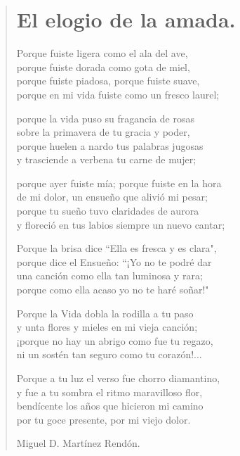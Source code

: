 \documentclass[12pt, twoside]{book}
\begin{document}
\begin{verse}
\begin{center}
\section{El elogio de la amada.}
\end{center}

Porque fuiste ligera como el ala del ave,\\
porque fuiste dorada como gota de miel,\\
porque fuiste piadosa, porque fuiste suave,\\
porque en mi vida fuiste como un fresco laurel;\newline

porque la vida puso su fragancia de rosas\\
sobre la primavera de tu gracia y poder,\\
porque huelen a nardo tus palabras jugosas\\
y trasciende a verbena tu carne de mujer;\newline

porque ayer fuiste mía; porque fuiste en la hora\\
de mi dolor, un ensueño que alivió mi pesar;\\
porque tu sueño tuvo claridades de aurora\\
y floreció en tus labios siempre un nuevo cantar;\newline

Porque la brisa dice ``Ella es fresca y es clara",\\
porque dice el Ensueño: ``¡Yo no te podré dar\\
una canción como ella tan luminosa y rara;\\
porque como ella acaso yo no te haré soñar!"\newline

Porque la Vida dobla la rodilla a tu paso\\
y unta flores y mieles en mi vieja canción;\\
¡porque no hay un abrigo como fue tu regazo,\\
ni un sostén tan seguro como tu corazón!...\newline

Porque a tu luz el verso fue chorro diamantino,\\
y fue a tu sombra el ritmo maravilloso flor,\\
bendícente los años que hicieron mi camino\\
por tu goce presente, por mi viejo dolor.\newline

Miguel D. Martínez Rendón. 

\end{verse}
\newpage
\end{document}
